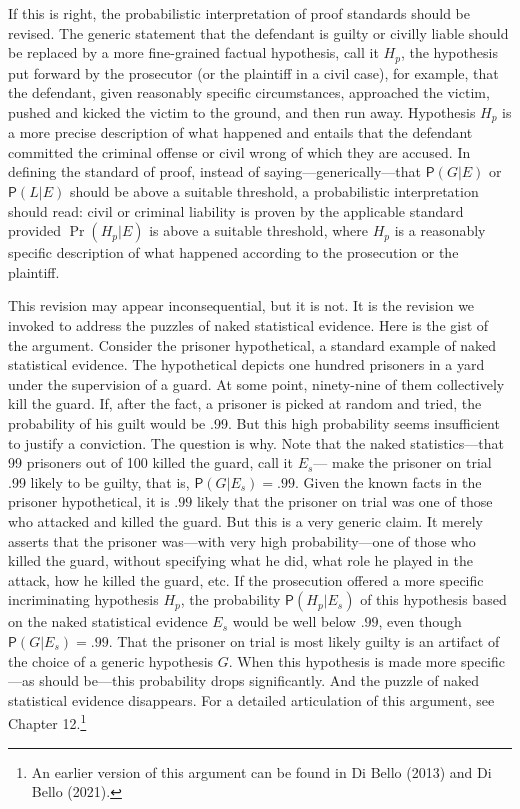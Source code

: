 \documentclass[
  10pt,
  dvipsnames,enabledeprecatedfontcommands]{scrartcl}
\newcommand{\pr}[1]{\ensuremath{\mathsf{P}(#1)}}
\begin{document}
If this is right, the probabilistic interpretation of proof standards
should be revised. The generic statement that the defendant is guilty or
civilly liable should be replaced by a more fine-grained factual
hypothesis, call it \(H_p\), the hypothesis put forward by the
prosecutor (or the plaintiff in a civil case), for example, that the
defendant, given reasonably specific circumstances, approached the
victim, pushed and kicked the victim to the ground, and then run away.
Hypothesis \(H_p\) is a more precise description of what happened and
entails that the defendant committed the criminal offense or civil wrong
of which they are accused. In defining the standard of proof, instead of
saying---generically---that \(\pr{G \vert E}\) or \(\pr{L \vert E}\)
should be above a suitable threshold, a probabilistic interpretation
should read: civil or criminal liability is proven by the applicable
standard provided \(\Pr(H_p \vert E)\) is above a suitable threshold,
where \(H_p\) is a reasonably specific description of what happened
according to the prosecution or the plaintiff.

This revision may appear inconsequential, but it is not. It is the
revision we invoked to address the puzzles of naked statistical
evidence. Here is the gist of the argument. Consider the prisoner
hypothetical, a standard example of naked statistical evidence. The
hypothetical depicts one hundred prisoners in a yard under the
supervision of a guard. At some point, ninety-nine of them collectively
kill the guard. If, after the fact, a prisoner is picked at random and
tried, the probability of his guilt would be .99. But this high
probability seems insufficient to justify a conviction. The question is
why. Note that the naked statistics---that 99 prisoners out of 100
killed the guard, call it \(E_s\)--- make the prisoner on trial .99
likely to be guilty, that is, \(\pr{G \vert E_s} =.99\). Given the known
facts in the prisoner hypothetical, it is \(.99\) likely that the
prisoner on trial was one of those who attacked and killed the guard.
But this is a very generic claim. It merely asserts that the prisoner
was---with very high probability---one of those who killed the guard,
without specifying what he did, what role he played in the attack, how
he killed the guard, etc. If the prosecution offered a more specific
incriminating hypothesis \(H_p\), the probability
\(\pr{H_p \vert E_{s}}\) of this hypothesis based on the naked
statistical evidence \(E_s\) would be well below \(.99\), even though
\(\pr{G \vert E_s}=.99\). That the prisoner on trial is most likely
guilty is an artifact of the choice of a generic hypothesis \(G\). When
this hypothesis is made more specific---as should be---this probability
drops significantly. And the puzzle of naked statistical evidence
disappears. For a detailed articulation of this argument, see Chapter
12.\footnote{An earlier version of this argument can be found in Di
  Bello (2013) and Di Bello (2021).}
\end{document}
